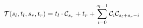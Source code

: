 \begin{equation}  \label{fun:tid}
  {\cal T}(s_l, t_l, s_r, t_r) = t_l \cdot {\cal C}_{s_r} + t_r +
  \sum_{i = 0}^{s_l - 1} {\cal C}_i {\cal C}_{s_l + s_r - i}
\end{equation}
